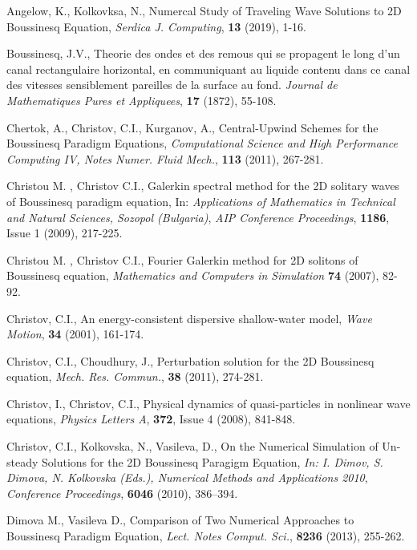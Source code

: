 \documentclass{article}
\begin{document}
\begin{thebibliography}{99}

 Angelow, K., Kolkovksa, N., Numercal Study of Traveling Wave Solutions to 2D Boussinesq Equation, {\it Serdica J. Computing}, \textbf{13} (2019), 1-16.

 Boussinesq, J.V., Theorie des ondes et des remous qui se propagent le long d'un canal rectangulaire horizontal, en communiquant au liquide contenu dans ce canal des vitesses sensiblement pareilles de la surface au fond.  {\it Journal de Mathematiques Pures et Appliquees}, \textbf{17} (1872), 55-108.

 Chertok, A., Christov, C.I., Kurganov, A., Central-Upwind Schemes for the Boussinesq Paradigm Equations,
{\it Computational Science and High Performance Computing IV, Notes Numer. Fluid Mech.}, \textbf{113} (2011), 267-281.

  Christou M. , Christov C.I.,
Galerkin spectral method for the 2D solitary waves of Boussinesq paradigm equation,
In: {\it Applications of Mathematics in Technical and Natural Sciences, Sozopol (Bulgaria)},
\emph{AIP Conference Proceedings}, \textbf{1186}, Issue 1 (2009), 217-225.

  Christou M. , Christov C.I.,
Fourier Galerkin method for 2D solitons of Boussinesq equation,
{\it Mathematics and Computers in Simulation} \textbf{74} (2007), 82-92.

 Christov, C.I., An energy-consistent dispersive shallow-water model,  {\it Wave Motion}, \textbf{34} (2001), 161-174.

 Christov, C.I., Choudhury, J., Perturbation solution for the 2D Boussinesq equation, {\it Mech. Res. Commun.}, \textbf{38} (2011), 274-281.

 Christov, I., Christov, C.I., Physical dynamics of quasi-particles in nonlinear wave equations,
{\it Physics Letters A}, \textbf{372}, Issue 4 (2008),  841-848.

 Christov, C.I., Kolkovska, N., Vasileva, D., On the Numerical Simulation of Un-
steady Solutions for the 2D Boussinesq Paragigm Equation,
{\it In: I. Dimov, S. Dimova, N. Kolkovska (Eds.), Numerical Methods and Applications 2010},
\emph{Conference Proceedings}, \textbf{6046} (2010), 386–394.

 Dimova M., Vasileva D., Comparison of Two Numerical Approaches to Boussinesq Paradigm Equation, 
{\it Lect. Notes Comput. Sci.}, \textbf{8236} (2013), 255-262.


\end{thebibliography}
\end{document}
